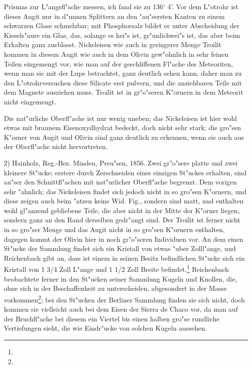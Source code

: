 \documentclass[a4paper, 11pt, oneside]{article}
\begin{document}
Prismas zur L"angsfl"ache messen, ich fand sie zu 136$^{\circ}$ 4’. Vor dem L"otrohr ist dieses Augit nur in d"unnen Splittern an den "au"sersten Kanten zu einem schwarzen Glase schmelzbar; mit Phosphorsalz bildet er unter Abscheidung der Kiesels"aure ein Glas, das, solange es hei"s ist, gr"unlichwei"s ist, das aber beim Erkalten ganz ausblasst. Nickeleisen wie auch in geringerer Menge Troilit kommen in diesem Augit wie auch in dem Olivin gew"ohnlich in sehr feinen Teilen eingemengt vor, wie man auf der geschliffenen Fl"ache des Meteoriten, wenn man sie mit der Lupe betrachtet, ganz deutlich sehen kann, daher man zu den L"otrohrversuchen diese Silicate erst pulvern, und die anziehbaren Teile mit dem Magnete ausziehen muss. Troilit ist in gr"o"seren K"ornern in dem Meteorit nicht eingemengt.

Die nat"urliche Oberfl"ache ist nur wenig uneben; das Nickeleisen ist hier wohl etwas mit braunem Eisenoxydhydrat bedeckt, doch nicht sehr stark; die gro"sen K"orner von Augit und Olivin sind ganz deutlich zu erkennen, wenn sie auch aus der Oberfl"ache nicht hervortreten.

2) Hainholz, Reg.-Bez. Minden, Preu"sen, 1856. Zwei gr"o"sere platte und zwei kleinere St"ucke; erstere durch Zerschneiden eines einzigen St"uckes erhalten, sind au"ser den Schnittfl"achen mit nat"urlicher Oberfl"ache begrenzt. Dem vorigen sehr "ahnlich; das Nickeleisen findet sich jedoch nicht in so gro"sen K"ornern, und diese zeigen auch beim "atzen keine Wid. Fig., sondern sind matt, und enthalten wohl gl"anzend gebliebene Teile, die aber nicht in der Mitte der K"orner liegen, sondern ganz an den Rand derselben gedr"angt sind. Der Troilit ist ferner nicht in so gro"ser Menge und das Augit nicht in so gro"sen K"ornern enthalten, dagegen kommt der Olivin hier in noch gr"o"seren Individuen vor. An dem einen St"ucke der Sammlung findet sich ein Kristall von etwas "uber Zolll"ange, und Reichenbach gibt an, dass ist einem in seinen Besitz befindlichen St"ucke sich ein Kristall von 1 3/4 Zoll L"ange und 1 1/2 Zoll Breite befindet.\footnote{} Reichenbach beobachtete ferner in den St"ucken seiner Sammlung Kugeln und Knollen, die, ohne sich in der Beschaffenheit zu unterscheiden, abgesondert in der Masse vorkommen\footnote{}; bei den St"ucken der Berliner Sammlung finden sie sich nicht, doch kommen sie vielleicht auch bei dem Eisen der Sierra de Chaco vor, da man auf der Bruchfl"ache bei diesem ein Viertel bis einen halben gro"se rundliche Vertiefungen sieht, die wie Eindr"ucke von solchen Kugeln aussehen.
\end{document}

